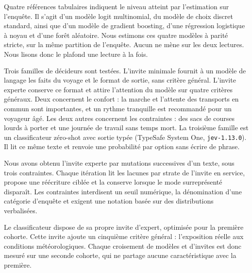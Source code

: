 Quatre références tabulaires indiquent le niveau atteint par l'estimation sur l'enquête. Il s'agit d'un modèle logit multinomial, du modèle de choix discret standard, ainsi que d'un modèle de gradient boosting, d'une régression logistique à noyau et d'une forêt aléatoire. Nous estimons ces quatre modèles à parité stricte, sur la même partition de l'enquête. Aucun ne mène sur les deux lectures. Nous lisons donc le plafond une lecture à la fois.

Trois familles de décideurs sont testées. L'invite minimale fournit à un modèle de langage les faits du voyage et le format de sortie, sans critère général. L'invite experte conserve ce format et attire l'attention du modèle sur quatre critères généraux. Deux concernent le confort : la marche et l'attente des transports en commun sont importantes, et un rythme tranquille est recommandé pour un voyageur âgé. Les deux autres concernent les contraintes : des sacs de courses lourds à porter et une journée de travail sans temps mort. La troisième famille est un classificateur zéro-shot avec sortie typée (TypeSafe System One, \texttt{jev-1.13.0}). Il lit ce même texte et renvoie une probabilité par option sans écrire de phrase.

Nous avons obtenu l'invite experte par mutations successives d'un texte, sous trois contraintes. Chaque itération lit les lacunes par strate de l'invite en service, propose une réécriture ciblée et la conserve lorsque le mode surreprésenté disparaît. Les contraintes interdisent un seuil numérique, la dénomination d'une catégorie d'enquête et exigent une notation basée sur des distributions verbalisées.

Le classificateur dispose de sa propre invite d'expert, optimisée pour la première cohorte. Cette invite ajoute un cinquième critère général : l'exposition réelle aux conditions météorologiques. Chaque croisement de modèles et d'invites est donc mesuré sur une seconde cohorte, qui ne partage aucune caractéristique avec la première.

